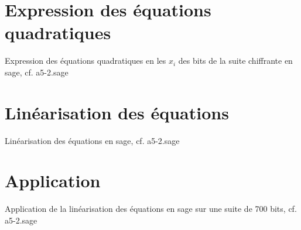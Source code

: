 \documentclass[a4paper]{article}
\begin{document}


\section{Expression des équations quadratiques}
Expression des équations quadratiques en les $x_i$ des bits de la suite chiffrante en sage, cf. a5-2.sage



\section{Linéarisation des équations}
Linéarisation des équations en sage, cf. a5-2.sage

\section{Application}
Application de la linéarisation des équations en sage sur une suite de 700 bits, cf. a5-2.sage









\nocite{*}
\end{document}
